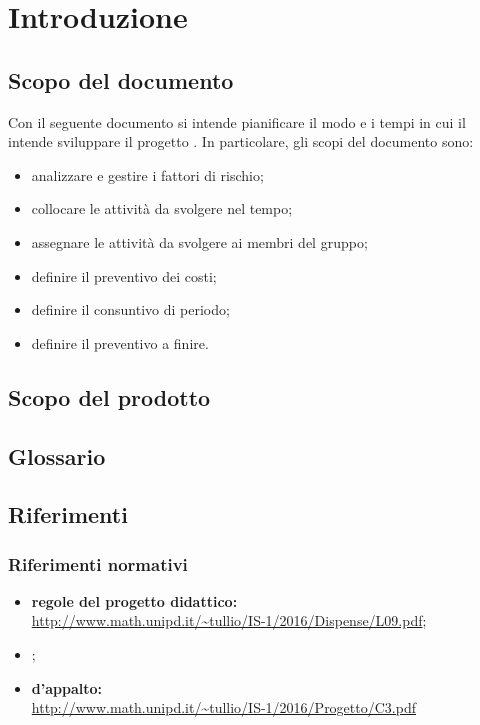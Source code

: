 \section {Introduzione}
	\subsection {Scopo del documento}
	Con il seguente documento si intende pianificare il modo e i tempi in cui il  intende sviluppare il progetto \progetto. In particolare, gli scopi del documento sono:
	\begin{itemize}
	 \item {analizzare e gestire i fattori di rischio;}
	 \item {collocare le attività da svolgere nel tempo;}
	 \item {assegnare le attività da svolgere ai membri del gruppo;}
	 \item {definire il preventivo dei costi;}
	 \item {definire il consuntivo di periodo;}
	 \item {definire il preventivo a finire.}
	\end{itemize}
	\subsection {Scopo del prodotto}
	\introScopo
	\subsection {Glossario}
	\introGlossario
	\subsection {Riferimenti}
		\subsubsection{Riferimenti normativi}
		\begin{itemize}
				\item \textbf{regole del progetto didattico:}\\
                \url{http://www.math.unipd.it/~tullio/IS-1/2016/Dispense/L09.pdf};
				\item {\ndpv};
				\item \textbf{ d'appalto:}\\
                \url{http://www.math.unipd.it/~tullio/IS-1/2016/Progetto/C3.pdf}
		\end{itemize}
